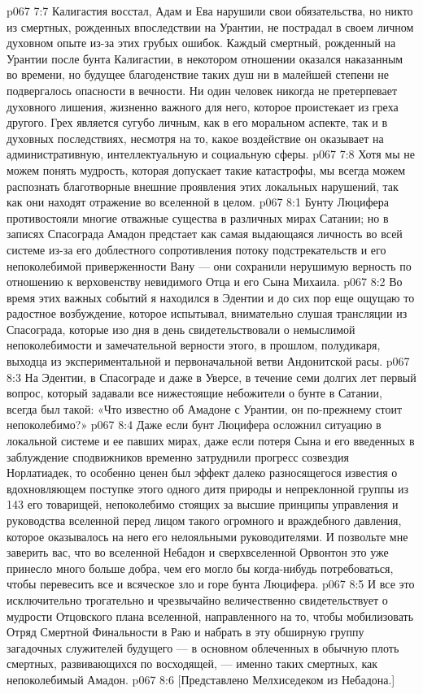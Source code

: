 \vs p067 7:7 Калигастия восстал, Адам и Ева нарушили свои обязательства, но никто из смертных, рожденных впоследствии на Урантии, не пострадал в своем личном духовном опыте из\hyp{}за этих грубых ошибок. Каждый смертный, рожденный на Урантии после бунта Калигастии, в некотором отношении оказался наказанным во времени, но будущее благоденствие таких душ ни в малейшей степени не подвергалось опасности в вечности. Ни один человек никогда не претерпевает духовного лишения, жизненно важного для него, которое проистекает из греха другого. Грех является сугубо личным, как в его моральном аспекте, так и в духовных последствиях, несмотря на то, какое воздействие он оказывает на административную, интеллектуальную и социальную сферы.
\vs p067 7:8 \pc Хотя мы не можем понять мудрость, которая допускает такие катастрофы, мы всегда можем распознать благотворные внешние проявления этих локальных нарушений, так как они находят отражение во вселенной в целом.
\vs p067 8:1 Бунту Люцифера противостояли многие отважные существа в различных мирах Сатании; но в записях Спасограда Амадон предстает как самая выдающаяся личность во всей системе из\hyp{}за его доблестного сопротивления потоку подстрекательств и его непоколебимой приверженности Вану --- они сохранили нерушимую верность по отношению к верховенству невидимого Отца и его Сына Михаила.
\vs p067 8:2 Во время этих важных событий я находился в Эдентии и до сих пор еще ощущаю то радостное возбуждение, которое испытывал, внимательно слушая трансляции из Спасограда, которые изо дня в день свидетельствовали о немыслимой непоколебимости и замечательной верности этого, в прошлом, полудикаря, выходца из экспериментальной и первоначальной ветви Андонитской расы.
\vs p067 8:3 На Эдентии, в Спасограде и даже в Уверсе, в течение семи долгих лет первый вопрос, который задавали все нижестоящие небожители о бунте в Сатании, всегда был такой: «Что известно об Амадоне с Урантии, он по\hyp{}прежнему стоит непоколебимо?»
\vs p067 8:4 Даже если бунт Люцифера осложнил ситуацию в локальной системе и ее павших мирах, даже если потеря Сына и его введенных в заблуждение сподвижников временно затруднили прогресс созвездия Норлатиадек, то особенно ценен был эффект далеко разносящегося известия о вдохновляющем поступке этого одного дитя природы и непреклонной группы из 143 его товарищей, непоколебимо стоящих за высшие принципы управления и руководства вселенной перед лицом такого огромного и враждебного давления, которое оказывалось на него его нелояльными руководителями. И позвольте мне заверить вас, что во вселенной Небадон и сверхвселенной Орвонтон это уже принесло много больше добра, чем его могло бы когда\hyp{}нибудь потребоваться, чтобы перевесить все и всяческое зло и горе бунта Люцифера.
\vs p067 8:5 И все это исключительно трогательно и чрезвычайно величественно свидетельствует о мудрости Отцовского плана вселенной, направленного на то, чтобы мобилизовать Отряд Смертной Финальности в Раю и набрать в эту обширную группу загадочных служителей будущего --- в основном облеченных в обычную плоть смертных, развивающихся по восходящей, --- именно таких смертных, как непоколебимый Амадон.
\vsetoff
\vs p067 8:6 [Представлено Мелхиседеком из Небадона.]
